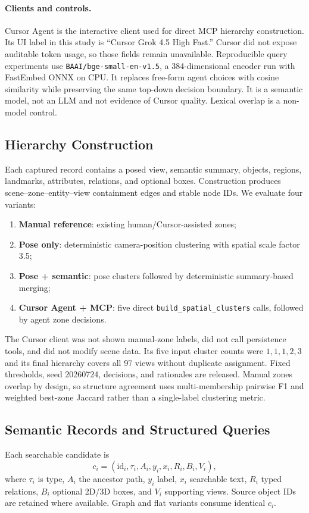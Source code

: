 \documentclass[10pt,twocolumn,letterpaper]{article}
\begin{document}
\paragraph{Clients and controls.}
Cursor Agent is the interactive client used for direct MCP hierarchy
construction. Its UI label in this study is ``Cursor Grok 4.5 High Fast.''
Cursor did not expose auditable token usage, so those fields remain
unavailable. Reproducible query experiments use
\texttt{BAAI/bge-small-en-v1.5}, a 384-dimensional encoder run with FastEmbed
ONNX on CPU. It replaces free-form agent choices with cosine similarity while
preserving the same top-down decision boundary. It is a semantic model, not an
LLM and not evidence of Cursor quality. Lexical overlap is a non-model control.

\subsection{Hierarchy Construction}
Each captured record contains a posed view, semantic summary, objects, regions,
landmarks, attributes, relations, and optional boxes. Construction produces
scene--zone--entity--view containment edges and stable node IDs. We evaluate
four variants:
\begin{enumerate}
  \item \textbf{Manual reference}: existing human/Cursor-assisted zones;
  \item \textbf{Pose only}: deterministic camera-position clustering with
  spatial scale factor 3.5;
  \item \textbf{Pose + semantic}: pose clusters followed by deterministic
  summary-based merging;
  \item \textbf{Cursor Agent + MCP}: five direct
  \texttt{build\_spatial\_clusters} calls, followed by agent zone decisions.
\end{enumerate}

The Cursor client was not shown manual-zone labels, did not call persistence
tools, and did not modify scene data. Its five input cluster counts were
$1,1,1,2,3$ and its final hierarchy covers all 97 views without duplicate
assignment. Fixed thresholds, seed 20260724, decisions, and rationales are
released. Manual zones overlap by design, so structure agreement uses
multi-membership pairwise F1 and weighted best-zone Jaccard rather than a
single-label clustering metric.

\subsection{Semantic Records and Structured Queries}
Each searchable candidate is
\begin{equation}
c_i=(\mathrm{id}_i,\tau_i,A_i,y_i,x_i,R_i,B_i,V_i),
\label{eq:candidate}
\end{equation}
where $\tau_i$ is type, $A_i$ the ancestor path, $y_i$ label, $x_i$ searchable
text, $R_i$ typed relations, $B_i$ optional 2D/3D boxes, and $V_i$ supporting
views. Source object IDs are retained where available. Graph and flat variants
consume identical $c_i$.
\end{document}
